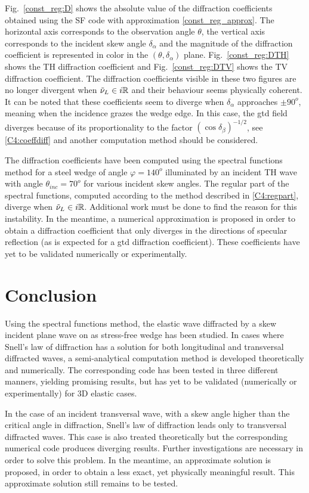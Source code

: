Fig.~\ref{const_reg:D} shows the absolute value of the diffraction coefficients obtained using the SF code with approximation \eqref{const_reg_approx}. The horizontal axis corresponds to the observation angle $\theta$, the vertical axis corresponds to the incident skew angle $\delta_{\alpha}$ and the magnitude of the diffraction coefficient is represented in color in the $(\theta,\delta_{\alpha})$ plane. Fig.~\ref{const_reg:DTH} shows the TH diffraction coefficient and Fig.~\ref{const_reg:DTV} shows the TV diffraction coefficient. The diffraction coefficients visible in these two figures are no longer divergent when $\tilde{\nu}_L \in i\mathbb{R}$ and their behaviour seems physically coherent. It can be noted that these coefficients seem to diverge when $\delta_{\alpha}$ approaches $\pm90^o$, meaning when the incidence grazes the wedge edge. In this case, the \acrshort{gtd} field diverges because of its proportionality to the factor $(\cos\delta_{\beta})^{-1/2}$, see \eqref{C4:coeffdiff} and another computation method should be considered.

The diffraction coefficients have been computed using the spectral functions method for a steel wedge of angle $\varphi=140^o$ illuminated by an incident TH wave with angle $\theta_{inc}=70^o$ for various incident skew angles. The regular part of the spectral functions, computed according to the method described in \ref{C4:regpart}, diverge when $\tilde{\nu}_L \in i\mathbb{R}$. Additional work must be done to find the reason for this instability. In the meantime, a numerical approximation is proposed in order to obtain a diffraction coefficient that only diverges in the directions of specular reflection (as is expected for a \acrshort{gtd} diffraction coefficient). These coefficients have yet to be validated numerically or experimentally.

\section*{Conclusion}
Using the spectral functions method, the elastic wave diffracted by a skew incident plane wave on as stress-free wedge has been studied. In cases where Snell's law of diffraction has a solution for both longitudinal and transversal diffracted waves, a semi-analytical computation method is developed theoretically and numerically. The corresponding code has been tested in three different manners, yielding promising results, but has yet to be validated (numerically or experimentally) for 3D elastic cases. 

In the case of an incident transversal wave, with a skew angle higher than the critical angle in diffraction, Snell's law of diffraction leads only to transversal diffracted waves. This case is also treated theoretically but the corresponding numerical code produces diverging results. Further investigations are necessary in order to solve this problem. In the meantime, an approximate solution is proposed, in order to obtain a less exact, yet physically meaningful result. This approximate solution still remains to be tested.
